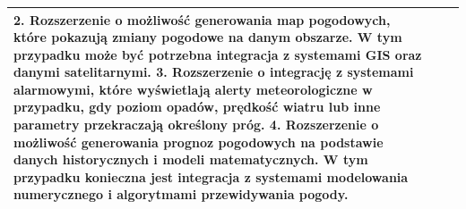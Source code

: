 \documentclass{article}
\begin{document}
\begin{center}
\begin{center}
\begin{tabular}{|l|l|l|}
{        \newline
        \textbf{2.} Rozszerzenie o możliwość generowania map pogodowych, które pokazują zmiany pogodowe na danym obszarze. W tym przypadku może być potrzebna integracja z systemami GIS oraz danymi satelitarnymi.
        \newline
        \textbf{3.} Rozszerzenie o integrację z systemami alarmowymi, które wyświetlają alerty meteorologiczne w przypadku, gdy poziom opadów, prędkość wiatru lub inne parametry przekraczają określony próg.
        \newline
        \textbf{4.} Rozszerzenie o możliwość generowania prognoz pogodowych na podstawie danych historycznych i modeli matematycznych. W tym przypadku konieczna jest integracja z systemami modelowania numerycznego i algorytmami przewidywania pogody.} \\
        \hline
        \end{tabular}
    \end{center}


\end{center}
\end{document}
